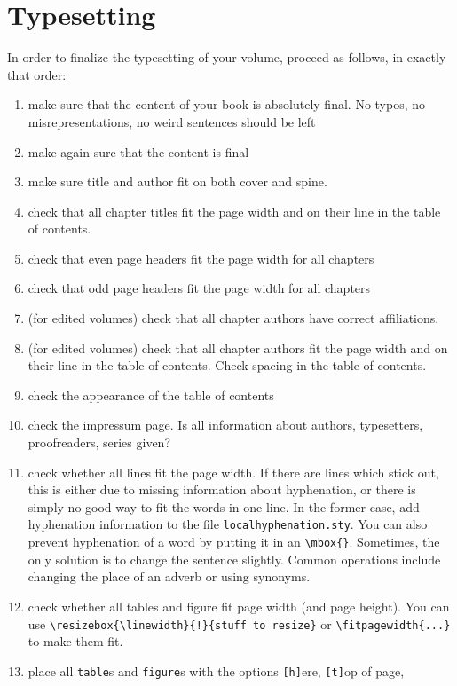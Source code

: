 \chapter{Typesetting}
In order to finalize the typesetting of your volume, proceed as follows, in exactly that order:

\begin{enumerate}
 \item make sure that the content of your book is absolutely final. No typos, no misrepresentations, no weird sentences should be left
 \item make again sure that the content is final 
 \item make sure title and author fit on both cover and spine. 
 \item check that all chapter titles fit the page width and on their line in the table of contents. 
 \item check that even page headers fit the page width for all chapters
 \item check that odd page headers fit the page width for all chapters
 \item (for edited volumes) check that all chapter authors have correct affiliations.
 \item (for edited volumes) check that all chapter authors fit the page width and on their line in the table of contents. Check spacing in the table of contents. 
 \item check the appearance of the table of contents
 \item check the impressum page. Is all information about authors, typesetters, proofreaders, series given?
 \item check whether all lines fit the page width. If there are lines which stick out, this is either due to missing information about hyphenation, or there is simply no good way to fit the words in one line. In the former case, add hyphenation information to the file \verb+localhyphenation.sty+. You can also prevent hyphenation of a word by putting it in an \verb+\mbox{}+. Sometimes, the only solution is to change the sentence slightly. Common operations include changing the place of an adverb or using synonyms.
 \item check whether all tables and figure fit page width (and page height). You can use \verb+\resizebox{\linewidth}{!}{stuff to resize}+ or \verb+\fitpagewidth{...}+  to make them fit.
 \item place all \verb+table+s and \verb+figure+s with the options 
\texttt{[h]}ere, 
\texttt{[t]}op of page, 

\end{enumerate}
